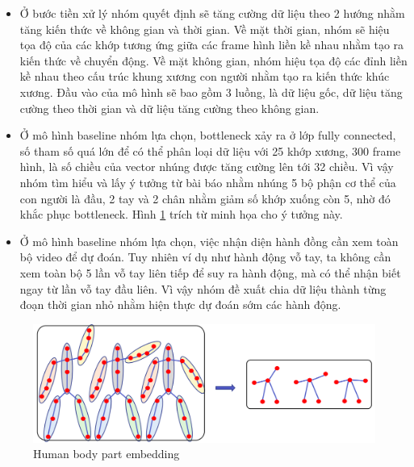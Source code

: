 \begin{itemize}
    \item Ở bước tiền xử lý nhóm quyết định sẽ tăng cường dữ liệu theo 2 hướng nhằm tăng kiến thức về không gian và thời gian. Về mặt thời gian, nhóm sẽ hiệu tọa độ của các khớp tương ứng giữa các frame hình liền kề nhau nhằm tạo ra kiến thức về chuyển động. Về mặt không gian, nhóm hiệu tọa độ các đỉnh liền kề nhau theo cấu trúc khung xương con người nhằm tạo ra kiến thức khúc xương. Đầu vào của mô hình sẽ bao gồm 3 luồng, là dữ liệu gốc, dữ liệu tăng cường theo thời gian và dữ liệu tăng cường theo không gian.
    \item Ở mô hình baseline nhóm lựa chọn, bottleneck xảy ra ở lớp fully connected, số tham số quá lớn để có thể phân loại dữ liệu với 25 khớp xương, 300 frame hình, là số chiều của vector nhúng được tăng cường lên tới 32 chiều. Vì vậy nhóm tìm hiểu và lấy ý tưởng từ bài báo \cite{song2020stronger} nhằm nhúng 5 bộ phận cơ thể của con người là đầu, 2 tay và 2 chân nhằm giảm số khớp xuống còn 5, nhờ đó khắc phục bottleneck. Hình \ref{fig:body-part-embedding} trích từ \cite{song2020stronger} minh họa cho ý tưởng này.
    \item Ở mô hình baseline nhóm lựa chọn, việc nhận diện hành đồng cần xem toàn bộ video để dự đoán. Tuy nhiên ví dụ như hành động vỗ tay, ta không cần xem toàn bộ 5 lần vỗ tay liên tiếp để suy ra hành động, mà có thể nhận biết ngay từ lần vỗ tay đầu liên. Vì vậy nhóm đề xuất chia dữ liệu thành từng đoạn thời gian nhỏ nhằm hiện thực dự đoán sớm các hành động.
\end{itemize}

\begin{figure}[!ht]
    \begin{center}
        \includegraphics[width=\linewidth]{asset/image/body_part_embedding.png}
        \caption{Human body part embedding}
        \label{fig:body-part-embedding}
    \end{center}
\end{figure}